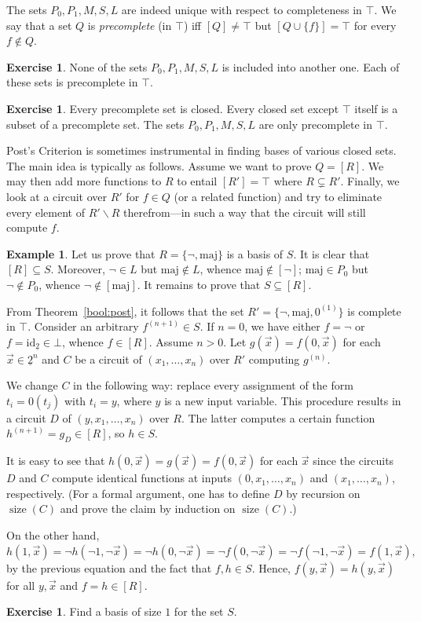 \documentclass[12pt,notitlepage]{article}
\theoremstyle{plain}
\theoremstyle{definition}
\newtheorem{exc}[thm]{Exercise}
\newtheorem{exm}[thm]{Example}
\theoremstyle{plain}
\newcommand{\sbs}{\subseteq}
\renewcommand{\setminus}{\smallsetminus}
\newcommand{\id}{\mathrm{id}}
\newcommand{\ul}[1]{\underline{#1}}
\newcommand{\1}{\mathbf{1}}
\newcommand{\0}{\mathbf{0}}
\DeclareMathOperator{\sz}{\mathrm size}
\begin{document}
The sets $P_0, P_1, M, S, L$ are indeed unique with respect to completeness in $\top$. We say that a set $Q$ is \emph{precomplete} (in $\top$) iff $[Q] \neq \top$ but $[Q \cup \{f\}] = \top$ for every $f \notin Q$.
\begin{exc}
None of the sets $P_0, P_1, M, S, L$ is included into another one. Each of these sets is precomplete in $\top$.
\end{exc}
\begin{exc}
Every precomplete set is closed. Every closed set except $\top$ itself is a subset of a precomplete set. The sets $P_0, P_1, M, S, L$ are only precomplete in $\top$.
\end{exc}

Post's Criterion is sometimes instrumental in finding bases of various closed sets. The main idea is typically as follows. Assume we want to prove $Q = [R]$. We may then add more functions to $R$ to entail $[R'] = \top$ where $R \subsetneq R'$. Finally, we look at a circuit over $R'$ for $f \in Q$ (or a related function) and try to eliminate every element of $R' \setminus R$ therefrom---in such a way that the circuit will still compute $f$.

\begin{exm}
Let us prove that $R = \{\neg, \mathrm{maj}\}$ is a basis of $S$. It is clear that $[R] \sbs S$. Moreover, $\neg \in L$ but $\mathrm{maj} \notin L$, whence $\mathrm{maj} \notin [{\neg}]$; $\mathrm{maj} \in P_0$ but $\neg \notin P_0$, whence ${\neg} \notin [\mathrm{maj}]$. It remains to prove that $S \sbs [R]$.

From Theorem~\ref{bool:post}, it follows that the set $R' = \{{\neg}, \mathrm{maj}, 0^{(1)}\}$ is complete in $\top$. Consider an arbitrary $f^{(n + 1)} \in S$. If $n = 0$, we have either $f = {\neg}$ or $f = \id_{\ul{2}} \in \bot$, whence $f \in [R]$. Assume $n > 0$. Let $g(\vec x) = f(0, \vec x)$ for each $\vec x \in \ul{2}^{n}$ and $C$ be a circuit of $(x_1, \ldots, x_n)$ over $R'$ computing $g^{(n)}$.

We change $C$ in the following way: replace every assignment of the form $t_i = 0(t_j)$ with $t_i = y$, where $y$ is a new input variable. This procedure results in a circuit $D$ of $(y,x_1, \ldots, x_n)$ over $R$. The latter computes a certain function $h^{(n+1)} = g_D \in [R]$, so $h \in S$.

It is easy to see that $h(0, \vec x) = g(\vec x) = f(0, \vec x)$ for each $\vec x$ since the circuits $D$ and $C$ compute identical functions at inputs $(0, x_1, \ldots, x_n)$ and $(x_1, \ldots, x_n)$, respectively. (For a formal argument, one has to define $D$ by recursion on $\sz(C)$ and prove the claim by induction on $\sz(C)$.)

On the other hand, 
$h(1, \vec x) = \neg h(\neg 1, \neg \vec x) = \neg h (0, \neg \vec x) = \neg f(0, \neg \vec x) = \neg f(\neg 1, \neg \vec x) = f(1, \vec x),$
by the previous equation and the fact that $f, h \in S$. Hence, $f(y, \vec x) = h(y, \vec x)$ for all $y, \vec x$ and $f = h \in [R]$.
\end{exm}
\begin{exc}
Find a basis of size $1$ for the set $S$.
\end{exc}
\end{document}
